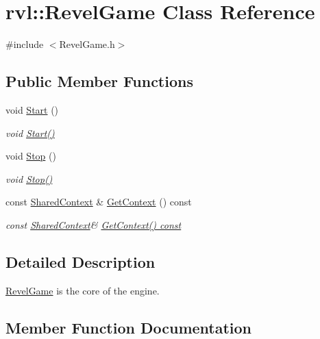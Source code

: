 \hypertarget{classrvl_1_1_revel_game}{}\section{rvl\+:\+:Revel\+Game Class Reference}
\label{classrvl_1_1_revel_game}


{\ttfamily \#include $<$Revel\+Game.\+h$>$}

\subsection*{Public Member Functions}
\begin{DoxyCompactItemize}
\item 
void \hyperlink{classrvl_1_1_revel_game_aaef0b7a8d82a7cc326b39f45c3be0b83}{Start} ()
\begin{DoxyCompactList}\small\item\em void \hyperlink{classrvl_1_1_revel_game_aaef0b7a8d82a7cc326b39f45c3be0b83}{Start()} \end{DoxyCompactList}\item 
void \hyperlink{classrvl_1_1_revel_game_ae2e535afe54176e266c1ec25ad11f9bc}{Stop} ()
\begin{DoxyCompactList}\small\item\em void \hyperlink{classrvl_1_1_revel_game_ae2e535afe54176e266c1ec25ad11f9bc}{Stop()} \end{DoxyCompactList}\item 
const \hyperlink{structrvl_1_1_shared_context}{Shared\+Context} \& \hyperlink{classrvl_1_1_revel_game_ab5f7b1a12844e3481d66ab00db1f0104}{Get\+Context} () const
\begin{DoxyCompactList}\small\item\em const \hyperlink{structrvl_1_1_shared_context}{Shared\+Context}\& \hyperlink{classrvl_1_1_revel_game_ab5f7b1a12844e3481d66ab00db1f0104}{Get\+Context() const} \end{DoxyCompactList}\end{DoxyCompactItemize}


\subsection{Detailed Description}
\hyperlink{classrvl_1_1_revel_game}{Revel\+Game} is the core of the engine. 

\subsection{Member Function Documentation}
\mbox{\label{classrvl_1_1_revel_game_ab5f7b1a12844e3481d66ab00db1f0104}} 
